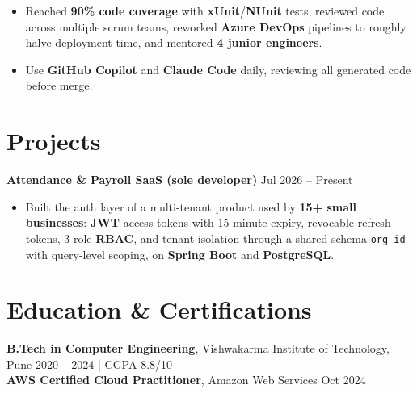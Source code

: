 \documentclass[a4paper,10pt]{article}
\begin{document}
\begin{itemize}[leftmargin=*]
    \item Reached \textbf{90\% code coverage} with \textbf{xUnit}/\textbf{NUnit} tests, reviewed code across multiple scrum teams, reworked \textbf{Azure DevOps} pipelines to roughly halve deployment time, and mentored \textbf{4 junior engineers}.
    \item Use \textbf{GitHub Copilot} and \textbf{Claude Code} daily, reviewing all generated code before merge.
\end{itemize}

\section*{Projects}

\textbf{Attendance \& Payroll SaaS (sole developer)} \hfill Jul 2026 -- Present
\begin{itemize}[leftmargin=*]
    \item Built the auth layer of a multi-tenant product used by \textbf{15+ small businesses}: \textbf{JWT} access tokens with 15-minute expiry, revocable refresh tokens, 3-role \textbf{RBAC}, and tenant isolation through a shared-schema \texttt{org\_id} with query-level scoping, on \textbf{Spring Boot} and \textbf{PostgreSQL}.
\end{itemize}

\section*{Education \& Certifications}
\textbf{B.Tech in Computer Engineering}, Vishwakarma Institute of Technology, Pune \hfill 2020 -- 2024 \;|\; CGPA 8.8/10 \\
\textbf{AWS Certified Cloud Practitioner}, Amazon Web Services \hfill Oct 2024
\end{document}
